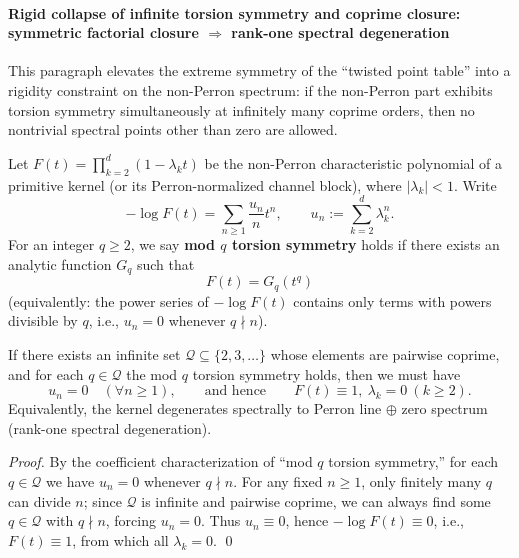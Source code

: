 \paragraph{Rigid collapse of infinite torsion symmetry and coprime closure: symmetric factorial closure \texorpdfstring{$\Rightarrow$}{=>} rank-one spectral degeneration}
This paragraph elevates the extreme symmetry of the ``twisted point table'' into a rigidity constraint on the non-Perron spectrum: if the non-Perron part exhibits torsion symmetry simultaneously at infinitely many coprime orders, then no nontrivial spectral points other than zero are allowed.

\begin{theorem}\label{thm:pom-infinite-coprime-torsion-symmetry-rankone}
Let \(F(t)=\prod_{k=2}^{d}(1-\lambda_k t)\) be the non-Perron characteristic polynomial of a primitive kernel (or its Perron-normalized channel block), where \(|\lambda_k|<1\).
Write
\[
-\log F(t)=\sum_{n\ge 1}\frac{u_n}{n}t^n,
\qquad
u_n:=\sum_{k=2}^{d}\lambda_k^n.
\]
For an integer \(q\ge 2\), we say \textbf{mod \(q\) torsion symmetry} holds if there exists an analytic function \(G_q\) such that
\[
\boxed{\;F(t)=G_q(t^q)\;}
\]
(equivalently: the power series of \(-\log F(t)\) contains only terms with powers divisible by \(q\), i.e., \(u_n=0\) whenever \(q\nmid n\)).
\par
If there exists an infinite set \(\mathcal Q\subseteq\{2,3,\dots\}\) whose elements are pairwise coprime, and for each \(q\in\mathcal Q\) the mod \(q\) torsion symmetry holds,
then we must have
\[
u_n=0\quad(\forall n\ge 1),
\qquad\text{and hence}\qquad
F(t)\equiv 1,\ \lambda_k=0\ (k\ge 2).
\]
Equivalently, the kernel degenerates spectrally to Perron line \(\oplus\) zero spectrum (rank-one spectral degeneration).
\end{theorem}
\begin{proof}
By the coefficient characterization of ``mod \(q\) torsion symmetry,'' for each \(q\in\mathcal Q\) we have \(u_n=0\) whenever \(q\nmid n\).
For any fixed \(n\ge 1\), only finitely many \(q\) can divide \(n\); since \(\mathcal Q\) is infinite and pairwise coprime, we can always find some \(q\in\mathcal Q\) with \(q\nmid n\), forcing \(u_n=0\).
Thus \(u_n\equiv 0\), hence \(-\log F(t)\equiv 0\), i.e., \(F(t)\equiv 1\), from which all \(\lambda_k=0\). \qed
\end{proof}

